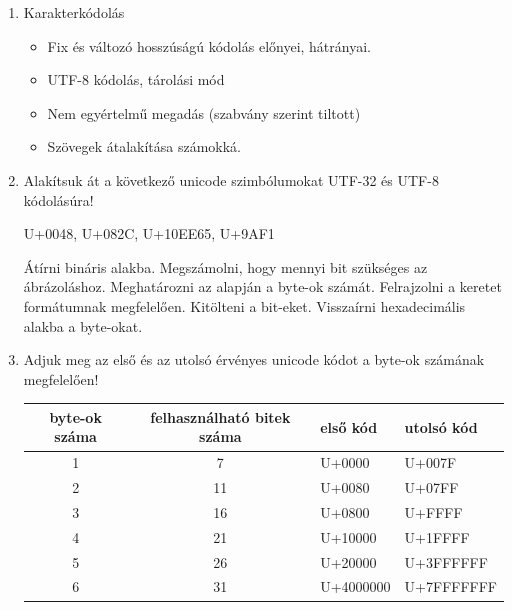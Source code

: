 \documentclass[a4paper]{article}
\newenvironment{solution}
{\color{RoyalBlue}}{\bigskip}
\begin{document}
\begin{enumerate}

\item

Karakterkódolás

\begin{solution}
\begin{itemize}
\item Fix és változó hosszúságú kódolás előnyei, hátrányai.
\item UTF-8 kódolás, tárolási mód
\item Nem egyértelmű megadás (szabvány szerint tiltott)
\item Szövegek átalakítása számokká.
\end{itemize}
\end{solution}

\item

Alakítsuk át a következő unicode szimbólumokat UTF-32 és UTF-8 kódolásúra!

U+0048, \quad U+082C, \quad U+10EE65, \quad U+9AF1

\begin{solution}
Átírni bináris alakba. Megszámolni, hogy mennyi bit szükséges az ábrázoláshoz. Meghatározni az alapján a byte-ok számát. Felrajzolni a keretet formátumnak megfelelően. Kitölteni a bit-eket. Visszaírni hexadecimális alakba a byte-okat.
\end{solution}

\item

Adjuk meg az első és az utolsó érvényes unicode kódot a byte-ok számának megfelelően!

\begin{solution}
\begin{center}
\begin{tabular}{|c|c|l|l|}
byte-ok száma & felhasználható bitek száma & első kód & utolsó kód \\
\hline
1 & 7 & U+0000 & U+007F \\
\hline
2 & 11 & U+0080 & U+07FF \\
\hline
3 & 16 & U+0800 & U+FFFF \\
\hline
4 & 21 & U+10000 & U+1FFFF \\
\hline
5 & 26 & U+20000 & U+3FFFFFF \\
\hline
6 & 31 & U+4000000 & U+7FFFFFFF \\
\hline
\end{tabular}
\end{center}
\end{solution}


\end{enumerate}
\end{document}
